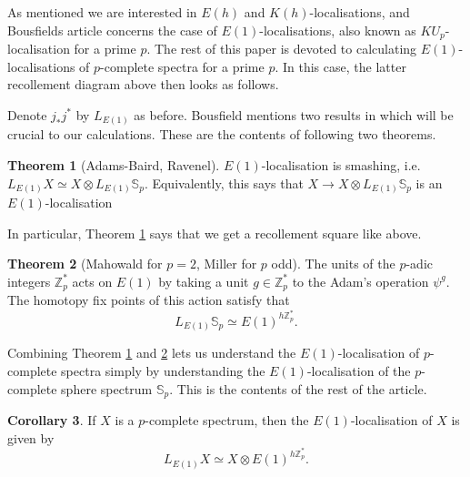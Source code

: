 \documentclass[a4paper]{article} %
\theoremstyle{definition}
\newtheorem{theorem}{Theorem} %
\newtheorem{corollary}[theorem]{Corollary}
\newcommand{\Z}{\mathbb{Z}}
\newcommand{\Spp}{\mathcal{D}(\mathbb{S}_p)}
\begin{document}
As mentioned we are interested in $E(h)$ and $K(h)$-localisations, and Bousfields article \cite{bousfield1979localization} concerns the case of $E(1)$-localisations, also known as $KU_p$-localisation for a prime $p$. The rest of this paper is devoted to calculating $E(1)$-localisations of $p$-complete spectra for a prime $p$. In this case, the latter recollement diagram above then looks as follows. 
\begin{center}
\end{center}
Denote $j_*j^*$ by $L_{E(1)}$ as before. Bousfield mentions two results in \cite{bousfield1979localization} which will be crucial to our calculations. These are the contents of following two theorems.
\begin{theorem}[Adams-Baird, Ravenel]\label{Adams-Baird, Ravenel}
  $E(1)$-localisation is smashing, i.e. $L_{E(1)}X \simeq X \otimes L_{E(1)} \mathbb{S}_p$. Equivalently, this says that $X \to X \otimes L_{E(1)} \mathbb{S}_p$ is an $E(1)$-localisation
\end{theorem}
In particular, Theorem \ref{Adams-Baird, Ravenel} says that we get a recollement square like above.
\begin{theorem}[Mahowald for $p=2$, Miller for $p$ odd]\label{Mahowald, Miller}
     The units of the $p$-adic integers $\Z_p^*$ acts on $E(1)$ by taking a unit $g \in \Z_p^*$ to the Adam's operation $\psi^g$. The homotopy fix points of this action satisfy that
     $$L_{E(1)}\mathbb{S}_p \simeq E(1)^{h\Z_p^*}.$$
\end{theorem}
Combining Theorem \ref{Adams-Baird, Ravenel} and \ref{Mahowald, Miller} lets us understand the $E(1)$-localisation of $p$-complete spectra simply by understanding the $E(1)$-localisation of the $p$-complete sphere spectrum $\mathbb{S}_p$. This is the contents of the rest of the article.
\begin{corollary}\label{Cor:E(1)local}
  If $X$ is a $p$-complete spectrum, then the $E(1)$-localisation of $X$ is given by
  \[
    L_{E(1)} X \simeq X \otimes E(1)^{h\Z_p^*}.
  \]
\end{corollary}
\end{document}
